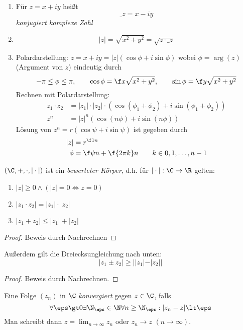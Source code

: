 \documentclass[a4paper,10pt]{scrartcl}
\begin{document}
\begin{df}
	\label{df:1.3}
	\begin{enumerate}
		\item 
			Für $z=x+iy$ heißt
			\[
				\_z = x-iy
			\]
			\emph{konjugiert komplexe Zahl}
		\item
			\[
				|z| = \sqrt{x^2+y^2} = \sqrt{z\cdot \_z}
			\]
		\item
			Polardarstellung: $z=x+iy = |z|(\cos \phi + i\sin\phi)$ wobei $\phi = \arg(z)$ (Argument von $z$) eindeutig durch
			\[
			-\pi \le \phi \le \pi, \qquad \cos\phi = \f x{\sqrt{x^2+y^2}}, \qquad \sin\phi = \f y{\sqrt{x^2+y^2}}
			\]
			Rechnen mit Polardarstellung:
			\begin{align*}
				z_1 \cdot z_2 &= |z_1|\cdot |z_2|\cdot (\cos(\phi_1+\phi_2) + i\sin(\phi_1+\phi_2))\\
				z^n &= |z|^n (\cos(n\phi) + i\sin(n\phi))
			\end{align*}
			Lösung von $z^n=r(\cos\psi + i\sin\psi)$ ist gegeben durch
			\begin{align*}
				|z| &= r^{\f 1n}\\
				\phi &= \f \psi n + \f {2\pi k}n \qquad k\in 0,1,\dotsc, n-1
			\end{align*}
	\end{enumerate}
\end{df}

\begin{st}
	\label{st:1.4}
	$(\C, +, \cdot, |\cdot|)$ ist ein \emph{bewerteter Körper}, d.h. für $|\cdot|: \C \to \R$ gelten:
	\begin{enumerate}
		\item $|z| \ge 0 \land (|z| = 0 \iff z = 0)$
		\item $|z_1\cdot z_2| = |z_1|\cdot |z_2|$
		\item $|z_1+z_2| \le |z_1| + |z_2|$
	\end{enumerate}
	\begin{proof}
		Beweis durch Nachrechnen
	\end{proof}
	\begin{note}
		Außerdem gilt die Dreiecksungleichung nach unten:
		\[
			|z_1 \pm z_2| \ge ||z_1| - |z_2||
		\]
		\begin{proof}
			Beweis durch Nachrechnen.
		\end{proof}
	\end{note}
\end{st}

\begin{df}
	\label{df:1.5}
	Eine Folge $(z_n)$ in $\C$ \emph{konvergiert} gegen $z\in \C$, falls
	\[
		\forall \eps \gt 0 \exists \N_\eps\in \N \forall n\ge \N_\eps : |z_n -z| \lt \eps
	\]
	Man schreibt dann $z = \lim_{n\to \infty} z_n$ oder $z_n \to z$ $(n\to \infty)$.
\end{df}
\end{document}
